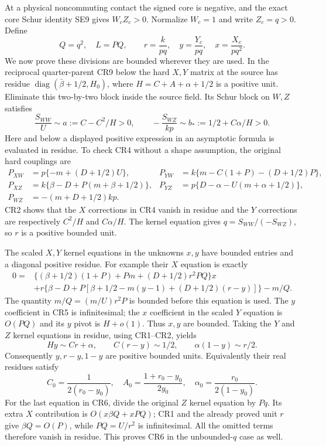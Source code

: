 At a physical noncommuting contact the signed core is negative, and
the exact core Schur identity SE9 gives $W_cZ_c>0$. Normalize $W_c=1$
and write $Z_c=q>0$. Define
\[
 Q=q^2,\quad L=PQ,\qquad
 r=\frac{k}{pq},\quad y=\frac{Y_c}{pq},\quad
 x=\frac{X_c}{pq^2}.
 \tag{CR3}
\]
We now prove these divisions are bounded wherever they are used.
In the reciprocal quarter-parent CR9 below the hard $X,Y$ matrix at
the source has residue
$\operatorname{diag}(\bar\beta+1/2,H_0)$, where
$H=C+A+\alpha+1/2$ is a positive unit. Eliminate this two-by-two
block inside the source field. Its Schur block on $W,Z$ satisfies
\[
 \frac{S_{WW}}{U}\sim a:=C-C^2/H>0,\qquad
 -\frac{S_{WZ}}{kp}\sim b_*:=1/2+C\alpha/H>0.
 \tag{CR4}
\]
Here and below a displayed positive expression in an asymptotic
formula is evaluated in residue. To check CR4 without a shape
assumption, the original hard couplings are
\[
\begin{aligned}
 P_{XW}&=p\{-m+(D+1/2)U\},&
 P_{YW}&=k\{m-C(1+P)-(D+1/2)P\},\\
 P_{XZ}&=k\{\beta-D+P(m+\beta+1/2)\},&
 P_{YZ}&=p\{D-\alpha-U(m+\alpha+1/2)\},\\
 P_{WZ}&=-(m+D+1/2)kp.
\end{aligned}
\]
CR2 shows that the $X$ corrections in CR4 vanish in residue and
the $Y$ corrections are respectively $C^2/H$ and $C\alpha/H$.
The kernel equation gives $q=S_{WW}/(-S_{WZ})$, so $r$ is a
positive bounded unit.

The scaled $X,Y$ kernel equations in the unknowns $x,y$ have
bounded entries and a diagonal positive residue. For example their
$X$ equation is exactly
\[
\begin{split}
 0={}&\{(\beta+1/2)(1+P)+Pm+(D+1/2)r^2PQ\}x\\
 &+r\{\beta-D+P[\beta+1/2-m(y-1)+(D+1/2)(r-y)]\}-m/Q.
\end{split}\tag{CR5}
\]
The quantity $m/Q=(m/U)r^2P$ is bounded before this equation is
used. The $y$ coefficient in CR5 is infinitesimal; the $x$
coefficient in the scaled $Y$ equation is $O(PQ)$ and its $y$
pivot is $H+o(1)$. Thus $x,y$ are bounded. Taking the $Y$ and
$Z$ kernel equations in residue, using CR1--CR2, yields
\[
 Hy\sim Cr+\alpha,\qquad C(r-y)\sim1/2,
 \qquad \alpha(1-y)\sim r/2.
 \tag{CR6}
\]
Consequently $y,r-y,1-y$ are positive bounded units. Equivalently
their real residues satisfy
\[
 C_0=\frac1{2(r_0-y_0)},\quad
 A_0=\frac{1+r_0-y_0}{2y_0},\quad
 \alpha_0=\frac{r_0}{2(1-y_0)}.
 \tag{CR7}
\]
For the last equation in CR6, divide the original $Z$ kernel
equation by $Pq$. Its extra $X$ contribution is
$O(x\beta Q+xPQ)$; CR1 and the already proved unit $r$ give
$\beta Q=O(P)$, while $PQ=U/r^2$ is infinitesimal. All the
omitted terms therefore vanish in residue. This proves CR6 in the
unbounded-$q$ case as well.

